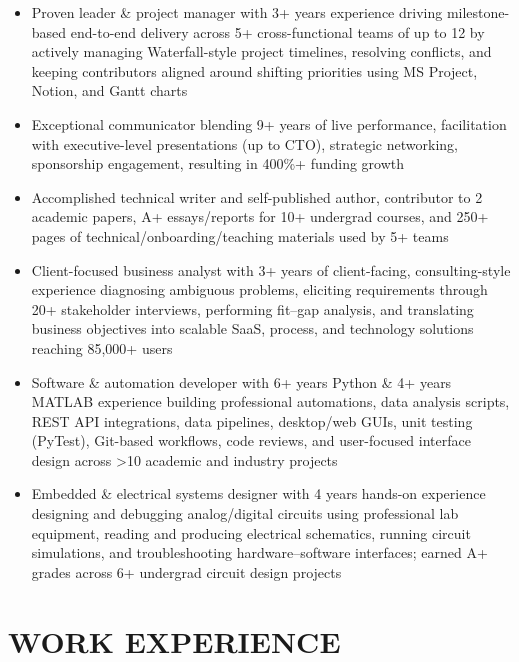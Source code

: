 \documentclass[a4paper,10pt]{article}
\begin{document}
\begin{itemize}[nosep,after=\strut, leftmargin=1em, itemsep=3pt,label=--]
  \item Proven leader \& project manager with 3+ years experience driving milestone-based end-to-end delivery across 5+
cross-functional teams of up to 12 by actively managing Waterfall-style project timelines, resolving conflicts, and
keeping contributors aligned around shifting priorities using MS Project, Notion, and Gantt charts
  \item Exceptional communicator blending 9+ years of live performance, facilitation with executive-level presentations
(up to CTO), strategic networking, sponsorship engagement, resulting in 400\%+ funding growth
  \item Accomplished technical writer and self-published author, contributor to 2 academic papers, A+ essays/reports for
10+ undergrad courses, and 250+ pages of technical/onboarding/teaching materials used by 5+ teams
  \item Client-focused business analyst with 3+ years of client-facing, consulting-style experience diagnosing ambiguous problems, eliciting requirements through 20+ stakeholder interviews, performing fit–gap analysis, and translating business objectives into scalable SaaS, process, and technology solutions reaching 85,000+ users
  \item Software \& automation developer with 6+ years Python \& 4+ years MATLAB experience building professional automations, data analysis scripts, REST API integrations, data pipelines, desktop/web GUIs, unit testing (PyTest),
Git-based workflows, code reviews, and user-focused interface design across >10 academic and industry projects
  \item Embedded \& electrical systems designer with 4 years hands-on experience designing and debugging analog/digital
circuits using professional lab equipment, reading and producing electrical schematics, running circuit simulations,
and troubleshooting hardware–software interfaces; earned A+ grades across 6+ undergrad circuit design projects
\end{itemize}


\section{WORK EXPERIENCE}
\end{document}
